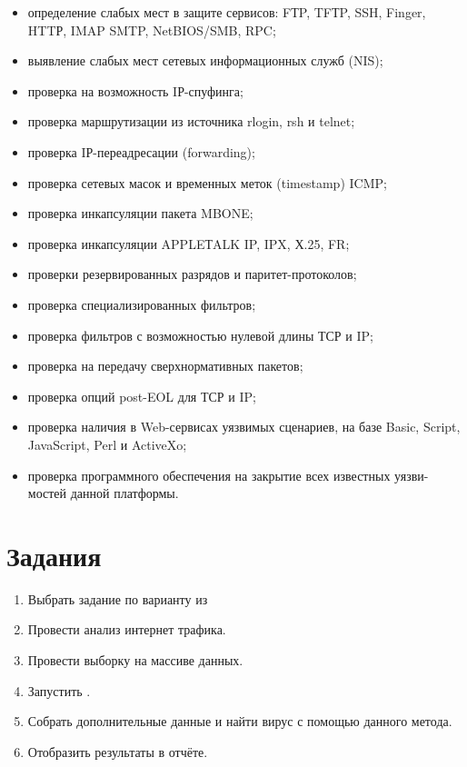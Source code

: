 \begin{itemize}
  \item определение слабых мест в защите сервисов: FТP, TFТP, SSH, Finger,
      HTTР, IMAP SMTP, NetBIOS/SMB, RPC;
  \item выявление слабых мест сетевых информационных служб (NIS);
  \item проверка на возможность IР-спуфинга;
  \item проверка маршрутизации из источника rlogin, rsh и telnet;
  \item проверка IР-переадресации (forwarding);
  \item проверка сетевых масок и временных меток (timestamp)  ICMP;
  \item проверка инкапсуляции пакета MBONE;
  \item проверка инкапсуляции APPLEТALK IP, IPX, Х.25, FR;
  \item проверки резервированных разрядов и паритет-протоколов;
  \item проверка специализированных фильтров;
  \item проверка фильтров с возможностью нулевой длины ТСР и IP;
  \item проверка на передачу сверхнормативных пакетов;
  \item проверка опций post-EOL для ТСР и IP;
  \item проверка  наличия в Web-сервисах  уязвимых  сценариев, на базе
      Basic, Script, JavaScript, Perl и ActiveXo;
  \item проверка программного обеспечения на закрытие всех известных уязви-
      мостей данной платформы.

\end{itemize}


\section{Задания}\label{sect7_b}
%
\begin{enumerate}
  \item Выбрать задание по варианту из 
  \item Провести анализ интернет трафика.
  \item Провести выборку на массиве данных.
  \item Запустить .
  \item Собрать дополнительные данные и найти вирус с помощью данного
      метода.
  \item Отобразить результаты в отчёте.
\end{enumerate}
